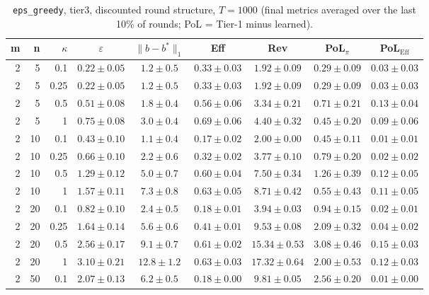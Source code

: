 \begin{table}[htbp]
\centering
\scriptsize
\caption{\texttt{eps\_greedy}, tier3, discounted round structure, $T=1000$ (final metrics averaged over the last 10\% of rounds; PoL = Tier-1 minus learned).}
\label{tab:tier3_eps_greedy_discounted}
\begin{tabular}{@{}rrrcccccc@{}}
\toprule
m & n & $\kappa$ & $\varepsilon$ & $\|b-b^*\|_1$ & Eff & Rev & PoL$_\pi$ & PoL$_\mathrm{Eff}$ \\
\midrule
2 & 5 & 0.1 & $0.22 \pm 0.05$ & $1.2 \pm 0.5$ & $0.33 \pm 0.03$ & $1.92 \pm 0.09$ & $0.29 \pm 0.09$ & $0.03 \pm 0.03$ \\
2 & 5 & 0.25 & $0.22 \pm 0.05$ & $1.2 \pm 0.5$ & $0.33 \pm 0.03$ & $1.92 \pm 0.09$ & $0.29 \pm 0.09$ & $0.03 \pm 0.03$ \\
2 & 5 & 0.5 & $0.51 \pm 0.08$ & $1.8 \pm 0.4$ & $0.56 \pm 0.06$ & $3.34 \pm 0.21$ & $0.71 \pm 0.21$ & $0.13 \pm 0.04$ \\
2 & 5 & 1 & $0.75 \pm 0.08$ & $3.0 \pm 0.4$ & $0.69 \pm 0.06$ & $4.40 \pm 0.32$ & $0.45 \pm 0.20$ & $0.09 \pm 0.06$ \\
2 & 10 & 0.1 & $0.43 \pm 0.10$ & $1.1 \pm 0.4$ & $0.17 \pm 0.02$ & $2.00 \pm 0.00$ & $0.45 \pm 0.11$ & $0.01 \pm 0.01$ \\
2 & 10 & 0.25 & $0.66 \pm 0.10$ & $2.2 \pm 0.6$ & $0.32 \pm 0.02$ & $3.77 \pm 0.10$ & $0.79 \pm 0.20$ & $0.02 \pm 0.02$ \\
2 & 10 & 0.5 & $1.29 \pm 0.12$ & $5.0 \pm 0.7$ & $0.60 \pm 0.04$ & $7.50 \pm 0.34$ & $1.26 \pm 0.39$ & $0.12 \pm 0.05$ \\
2 & 10 & 1 & $1.57 \pm 0.11$ & $7.3 \pm 0.8$ & $0.63 \pm 0.05$ & $8.71 \pm 0.42$ & $0.55 \pm 0.43$ & $0.11 \pm 0.05$ \\
2 & 20 & 0.1 & $0.82 \pm 0.10$ & $2.4 \pm 0.5$ & $0.18 \pm 0.01$ & $3.94 \pm 0.03$ & $0.94 \pm 0.15$ & $0.02 \pm 0.01$ \\
2 & 20 & 0.25 & $1.64 \pm 0.14$ & $5.6 \pm 0.6$ & $0.41 \pm 0.01$ & $9.53 \pm 0.08$ & $2.09 \pm 0.32$ & $0.04 \pm 0.02$ \\
2 & 20 & 0.5 & $2.56 \pm 0.17$ & $9.1 \pm 0.7$ & $0.61 \pm 0.02$ & $15.34 \pm 0.53$ & $3.08 \pm 0.46$ & $0.15 \pm 0.03$ \\
2 & 20 & 1 & $3.10 \pm 0.21$ & $12.8 \pm 1.2$ & $0.63 \pm 0.03$ & $17.32 \pm 0.64$ & $2.00 \pm 0.53$ & $0.12 \pm 0.03$ \\
2 & 50 & 0.1 & $2.07 \pm 0.13$ & $6.2 \pm 0.5$ & $0.18 \pm 0.00$ & $9.81 \pm 0.05$ & $2.56 \pm 0.20$ & $0.01 \pm 0.00$ \\

\end{tabular}
\end{table}
